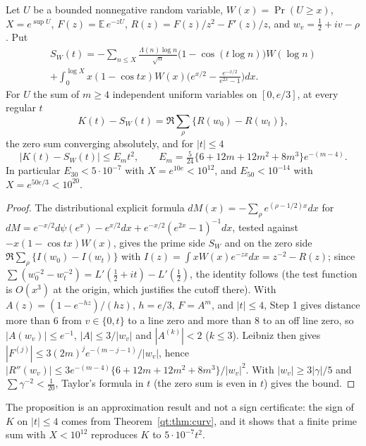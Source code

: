 \begin{proposition}\label{qt:prop:curvapprox}
Let $U$ be a bounded nonnegative random variable, $W(x)=\Pr(U\ge x)$, $X=e^{\sup U}$, $F(z)=\mathbb E\,e^{-zU}$, $R(z)=F(z)/z^2-F'(z)/z$, and $w_v=\tfrac12+iv-\rho$. Put
\begin{multline*}
S_W(t)=-\sum_{n\le X}\frac{\Lambda(n)\log n}{\sqrt n}\big(1-\cos(t\log n)\big)W(\log n)\\+\int_0^{\log X}x(1-\cos tx)W(x)\Big(e^{x/2}-\frac{e^{-x/2}}{e^{2x}-1}\Big)dx.
\end{multline*}
For $U$ the sum of $m\ge4$ independent uniform variables on $[0,e/3]$, at every regular $t$
\[
K(t)-S_W(t)=\Re\sum_\rho\{R(w_0)-R(w_t)\},
\]
the zero sum converging absolutely, and for $|t|\le4$
\[
|K(t)-S_W(t)|\le E_mt^2,\qquad E_m=\tfrac5{24}\{6+12m+12m^2+8m^3\}e^{-(m-4)}.
\]
In particular $E_{30}<5\cdot10^{-7}$ with $X=e^{10e}<10^{12}$, and $E_{50}<10^{-14}$ with $X=e^{50e/3}<10^{20}$.
\end{proposition}

\begin{proof}
The distributional explicit formula $dM(x)=-\sum_\rho e^{(\rho-1/2)x}dx$ for $dM=e^{-x/2}d\psi(e^x)-e^{x/2}dx+e^{-x/2}(e^{2x}-1)^{-1}dx$, tested against $-x(1-\cos tx)W(x)$, gives the prime side $S_W$ and on the zero side $\Re\sum_\rho\{I(w_0)-I(w_t)\}$ with $I(z)=\int xW(x)e^{-zx}dx=z^{-2}-R(z)$; since $\sum(w_0^{-2}-w_t^{-2})=L'(\tfrac12+it)-L'(\tfrac12)$, the identity follows (the test function is $O(x^3)$ at the origin, which justifies the cutoff there). With $A(z)=(1-e^{-hz})/(hz)$, $h=e/3$, $F=A^m$, and $|t|\le4$, Step 1 gives distance more than $6$ from $v\in\{0,t\}$ to a line zero and more than $8$ to an off line zero, so $|A(w_v)|\le e^{-1}$, $|A|\le3/|w_v|$ and $|A^{(k)}|<2$ ($k\le3$). Leibniz then gives $|F^{(j)}|\le3(2m)^je^{-(m-j-1)}/|w_v|$, hence $|R''(w_v)|\le3e^{-(m-4)}\{6+12m+12m^2+8m^3\}/|w_v|^2$. With $|w_v|\ge3|\gamma|/5$ and $\sum\gamma^{-2}<\tfrac1{20}$, Taylor's formula in $t$ (the zero sum is even in $t$) gives the bound.
\end{proof}

The proposition is an approximation result and not a sign certificate: the sign of $K$ on $|t|\le4$ comes from Theorem~\ref{qt:thm:curv}, and it shows that a finite prime sum with $X<10^{12}$ reproduces $K$ to $5\cdot10^{-7}t^2$.

